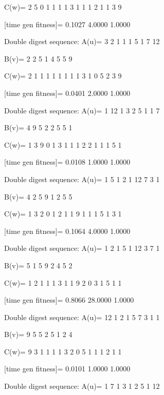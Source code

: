 C(w)=
     2     5     0     1     1     1     1     3     1     1     1     2     1     1     3     9

[time gen fitness]=
    0.1027    4.0000    1.0000

Double digest sequence:
A(u)=
     3     2     1     1     1     5     1     7    12

B(v)=
     2     2     5     1     4     5     5     9

C(w)=
     2     1     1     1     1     1     1     1     1     3     1     0     5     2     3     9

[time gen fitness]=
    0.0401    2.0000    1.0000

Double digest sequence:
A(u)=
     1    12     1     3     2     5     1     1     7

B(v)=
     4     9     5     2     2     5     5     1

C(w)=
     1     3     9     0     1     3     1     1     1     2     2     1     1     1     5     1

[time gen fitness]=
    0.0108    1.0000    1.0000

Double digest sequence:
A(u)=
     1     5     1     2     1    12     7     3     1

B(v)=
     4     2     5     9     1     2     5     5

C(w)=
     1     3     2     0     1     2     1     1     9     1     1     1     5     1     3     1

[time gen fitness]=
    0.1064    4.0000    1.0000

Double digest sequence:
A(u)=
     1     2     1     5     1    12     3     7     1

B(v)=
     5     1     5     9     2     4     5     2

C(w)=
     1     2     1     1     1     3     1     1     9     2     0     3     1     5     1     1

[time gen fitness]=
    0.8066   28.0000    1.0000

Double digest sequence:
A(u)=
    12     1     2     1     5     7     3     1     1

B(v)=
     9     5     5     2     5     1     2     4

C(w)=
     9     3     1     1     1     1     3     2     0     5     1     1     1     2     1     1

[time gen fitness]=
    0.0101    1.0000    1.0000

Double digest sequence:
A(u)=
     1     7     1     3     1     2     5     1    12


